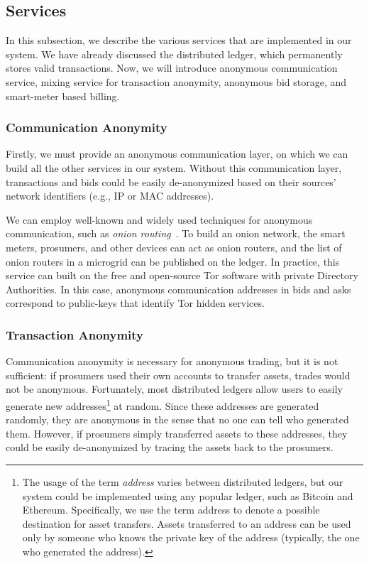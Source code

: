 \subsection{Services}

In this subsection, we describe the various services that are implemented in our system. %
We have already discussed the distributed ledger, which permanently stores valid transactions.
Now, we will introduce anonymous communication service, mixing service for transaction anonymity, anonymous bid storage, and smart-meter based billing.

\subsubsection{Communication Anonymity}
Firstly, we must provide an anonymous communication layer, on which we can build all the other services in our system.
Without this communication layer, transactions and bids could be easily de-anonymized based on their sources' network identifiers (e.g., IP or MAC addresses).

We can employ well-known and widely used techniques for anonymous communication, such as \emph{onion routing}~\cite{reed1998anonymous}.
To build an onion network, the smart meters, prosumers, and other devices can act as onion routers, and the list of onion routers in a microgrid can be published on the ledger.
In practice, this service can built on 
 the free and open-source Tor software with private Directory Authorities.
In this case, anonymous communication addresses in bids and asks correspond to public-keys that identify Tor hidden services.

\subsubsection{Transaction Anonymity}
Communication anonymity is necessary for anonymous trading, but it is not sufficient: if prosumers used their own accounts to transfer assets, trades would not be anonymous.
Fortunately, most distributed ledgers allow users to easily generate new addresses\footnote{The usage of the term \emph{address} varies between distributed ledgers, but our system could be implemented using any popular ledger, such as Bitcoin and Ethereum. 
Specifically, we use the term address to denote a possible destination for asset transfers. 
Assets transferred to an address can be used only by someone who knows the private key of the address (typically, the one who generated the address).} 
at random.
Since these addresses are generated randomly, they are anonymous in the sense that no one can tell who generated them.
However, if prosumers simply transferred assets to these addresses, they could be easily de-anonymized by tracing the assets back to the prosumers.

